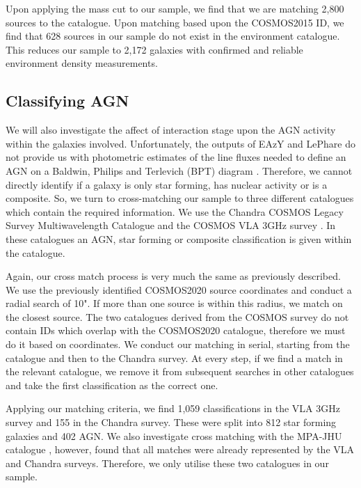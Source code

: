 \documentclass[fleqn,usenatbib]{mnras}
\begin{document}
Upon applying the mass cut to our sample, we find that we are matching 2,800 sources to the \citet{2017ApJ...837...16D} catalogue. Upon matching based upon the COSMOS2015 ID, we find that 628 sources in our sample do not exist in the environment catalogue. This reduces our sample to 2,172 galaxies with confirmed and reliable environment density measurements.

\subsection{Classifying AGN}
\noindent We will also investigate the affect of interaction stage upon the AGN activity within the galaxies involved. Unfortunately, the outputs of EAzY and LePhare do not provide us with photometric estimates of the line fluxes needed to define an AGN on a Baldwin, Philips and Terlevich (BPT) diagram \citep{}. Therefore, we cannot directly identify if a galaxy is only star forming, has nuclear activity or is a composite. So, we turn to cross-matching our sample to three different catalogues which contain the required information. We use the Chandra COSMOS Legacy Survey Multiwavelength Catalogue \citep{2016ApJ...817...34M} and the COSMOS VLA 3GHz survey \citep{2017A&A...602A...6S, 2017A&A...602A...3D}. In these catalogues an AGN, star forming or composite classification is given within the catalogue.

Again, our cross match process is very much the same as previously described. We use the previously identified COSMOS2020 source coordinates and conduct a radial search of 10". If more than one source is within this radius, we match on the closest source. The two catalogues derived from the COSMOS survey do not contain IDs which overlap with the COSMOS2020 catalogue, therefore we must do it based on coordinates. We conduct our matching in serial, starting from the \citet{2017A&A...602A...6S} catalogue and then to the Chandra survey. At every step, if we find a match in the relevant catalogue, we remove it from subsequent searches in other catalogues and take the first classification as the correct one.

Applying our matching criteria, we find 1,059 classifications in the VLA 3GHz survey and 155 in the Chandra survey. These were split into 812 star forming galaxies and 402 AGN. We also investigate cross matching with the MPA-JHU catalogue \citep{2003MNRAS.341...33K, 2004MNRAS.351.1151B, 2007ApJS..173..267S}, however, found that all matches were already represented by the VLA and Chandra surveys. Therefore, we only utilise these two catalogues in our sample.
\end{document}
